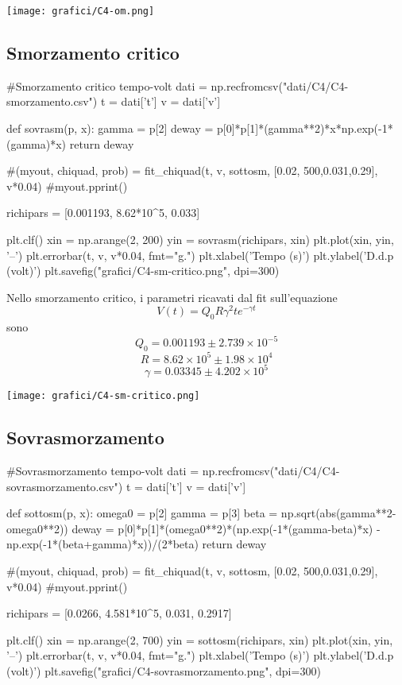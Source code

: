 \begin{center}
 \texttt{[image: grafici/C4-om.png]}
\end{center}
\subsection{Smorzamento critico}

\begin{sagesilent}

#Smorzamento critico tempo-volt
dati = np.recfromcsv("dati/C4/C4-smorzamento.csv")
t = dati['t']
v = dati['v']

def sovrasm(p, x):
  gamma = p[2]
  deway = p[0]*p[1]*(gamma**2)*x*np.exp(-1*(gamma)*x)
  return deway
  
#(myout, chiquad, prob) = fit_chiquad(t, v, sottosm, [0.02, 500,0.031,0.29], v*0.04)
#myout.pprint()

richipars = [0.001193, 8.62*10^5, 0.033]

plt.clf()
xin = np.arange(2, 200)
yin = sovrasm(richipars, xin)
plt.plot(xin, yin, '--')
plt.errorbar(t, v, v*0.04, fmt="g.")
plt.xlabel('Tempo (s)')
plt.ylabel('D.d.p (volt)')
plt.savefig("grafici/C4-sm-critico.png", dpi=300)
\end{sagesilent}
Nello smorzamento critico, i parametri ricavati dal fit sull'equazione
$$V(t) = Q_0R\gamma^2te^{-\gamma t}$$
sono
$$Q_0 = 0.001193\pm2.739\times10^{-5}$$
$$R=8.62\times10^5\pm1.98\times10^4$$
$$\gamma = 0.03345\pm4.202\times10^5$$

\begin{center}
\texttt{[image: grafici/C4-sm-critico.png]}
\end{center}

\subsection{Sovrasmorzamento}
\begin{sagesilent}
#Sovrasmorzamento tempo-volt
dati = np.recfromcsv("dati/C4/C4-sovrasmorzamento.csv")
t = dati['t']
v = dati['v']

def sottosm(p, x):
  omega0 = p[2]
  gamma = p[3]
  beta = np.sqrt(abs(gamma**2-omega0**2))
  deway = p[0]*p[1]*(omega0**2)*(np.exp(-1*(gamma-beta)*x) - np.exp(-1*(beta+gamma)*x))/(2*beta)
  return deway
  
#(myout, chiquad, prob) = fit_chiquad(t, v, sottosm, [0.02, 500,0.031,0.29], v*0.04)
#myout.pprint()

richipars = [0.0266, 4.581*10^5, 0.031, 0.2917]

plt.clf()
xin = np.arange(2, 700)
yin = sottosm(richipars, xin)
plt.plot(xin, yin, '--')
plt.errorbar(t, v, v*0.04, fmt="g.")
plt.xlabel('Tempo (s)')
plt.ylabel('D.d.p (volt)')
plt.savefig("grafici/C4-sovrasmorzamento.png", dpi=300)
\end{sagesilent}

